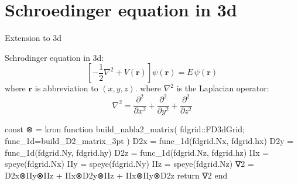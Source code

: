 \chapter{Schroedinger equation in 3d}

Extension to 3d \cite{juliaorg}

Schrodinger equation in 3d:
\begin{equation}
\left[ -\frac{1}{2}\nabla^2 + V(\mathbf{r}) \right] \psi(\mathbf{r}) = E\,\psi(\mathbf{r})
\end{equation}
where $\mathbf{r}$ is abbreviation to $(x,y,z)$.
%
where $\nabla^2$ is the Laplacian operator:
\begin{equation}
\nabla^2 = \frac{\partial^2}{\partial x^2} + \frac{\partial^2}{\partial y^2} +
\frac{\partial^2}{\partial z^2}
\end{equation}

\begin{juliacode}
const ⊗ = kron
function build_nabla2_matrix( fdgrid::FD3dGrid; func_1d=build_D2_matrix_3pt )
    D2x = func_1d(fdgrid.Nx, fdgrid.hx)
    D2y = func_1d(fdgrid.Ny, fdgrid.hy)
    D2z = func_1d(fdgrid.Nz, fdgrid.hz)
    IIx = speye(fdgrid.Nx)
    IIy = speye(fdgrid.Ny)
    IIz = speye(fdgrid.Nz)
    ∇2 = D2x⊗IIy⊗IIz + IIx⊗D2y⊗IIz + IIx⊗IIy⊗D2z 
    return ∇2
end
\end{juliacode}